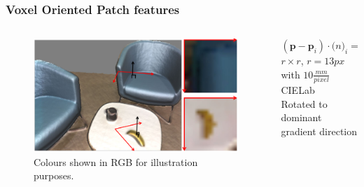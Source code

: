 \documentclass[mathserif, 10pt]{beamer}
\begin{document}
\begin{frame}
\frametitle{Voxel Oriented Patch features}

\begin{columns}
 \begin{column}{0.5\textwidth}
  \begin{figure}
  \center
  \includegraphics[width=\textwidth]{figures/vop}
  \caption{Colours shown in RGB for illustration purposes.}
  \label{fig:vop}
\end{figure}
 \end{column}
 \begin{column}{0.5\textwidth}
    $(\mathbf{p} - \mathbf{p}_i) \cdot \mathbf(n)_i = 0$ \\
    $r \times r$, $r = 13px$ with $10\frac{mm}{pixel}$\\
    CIELab\\
    Rotated to dominant gradient direction

  
 \end{column}

\end{columns}
\end{frame}
\end{document}
